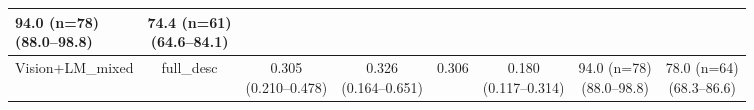 \documentclass[FCD_GNN.tex]{subfiles}
\begin{document}
\begin{table}[ht]
\begin{tabular}{lccccccc}
    \makecell{94.0 (n=78) \\ (88.0--98.8)} &
    \makecell{\colorbox{orange!15}{74.4 (n=61)} \\ (64.6--84.1)} \\
    \hline
    Vision+LM\_mixed & 
    full\_desc &
    \makecell{0.305 \\ (0.210--0.478)} &
    \makecell{0.326 \\ (0.164--0.651)} &
    0.306 &
    \makecell{0.180 \\ (0.117--0.314)} &
    \makecell{94.0 (n=78) \\ (88.0--98.8)} &
    \makecell{\colorbox{green!15}{78.0 (n=64)} \\ (68.3--86.6)} \\
    
    \hline
    \end{tabular}
    \end{table}
\end{document}
